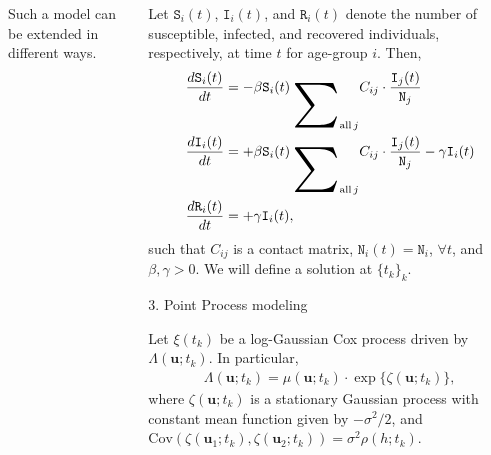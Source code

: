 \documentclass[12pt]{beamer}
\begin{document}
\begin{frame}[t]
\begin{columns}[t]
\begin{column}{0.24175\textwidth}
\begin{block}{}
			Such a model can be extended in different ways.
			
			\vspace{2pt}
			\end{block}
		
			
			\end{column}
		
			\begin{column}{0.24175\textwidth} \justifying %
			
			\begin{block}{}
			\justifying
			
			Let $\texttt{S}_i(t)$, $\texttt{I}_i(t)$, and $\texttt{R}_i(t)$ denote the number of susceptible, infected, \hspace{-1pt}and recovered individuals, \hspace{-1pt}respectively,\hspace{-1pt} at time \hspace{-1pt}$t$ for age-group $i$. Then,
			\begin{align} \label{eq:SIRmodel}
				\frac{d\texttt{S}_i(t)}{dt} &= -\beta \texttt{S}_i(t) \, \displaystyle\raisebox{-18pt}{\scalebox{3.2}{\ensuremath{\sum}}}_{\text{all}\,j}C_{ij}\cdot\frac{\texttt{I}_j(t)}{\texttt{N}_j} \\
				\frac{d\texttt{I}_i(t)}{dt} &= +\beta \texttt{S}_i(t) \, \displaystyle\raisebox{-18pt}{\scalebox{3.2}{\ensuremath{\sum}}}_{\text{all}\,j}C_{ij}\cdot\frac{\texttt{I}_j(t)}{\texttt{N}_j} - \gamma \texttt{I}_i(t) \nonumber \\
				\frac{d\texttt{R}_i(t)}{dt} &= +\gamma \texttt{I}_i(t), \nonumber
			\end{align}
			such that $C_{ij}$ is a contact matrix, $\texttt{N}_i(t) = \texttt{N}_i$, $\forall t$, and $\beta, \gamma > 0$.  We will define a solution at $\{t_k\}_k$.
			
			\vspace{18pt}
			
			\textcolor{strong-blue}{\Large 3. Point Process modeling} \justifying \vspace{12pt}
			
			Let $\xi(t_k)$ be a log-Gaussian Cox process driven by $\Lambda(\mathbf{u}; t_k)$. In particular,
			\begin{align} \label{eq:llambda}
				\Lambda(\mathbf{u}; t_k) = \mu(\mathbf{u}; t_k) \cdot \exp\{\zeta(\mathbf{u}; t_k)\},
			\end{align}
			where  $\zeta(\mathbf{u}; t_k)$ is a stationary Gaussian process with constant mean function given by $-\sigma^2/2$, and $\text{Cov}(\zeta(\mathbf{u}_1; t_k), \zeta(\mathbf{u}_2; t_k)) = \sigma^2 \rho(h; t_k)$. \vspace{12pt}
			

\end{block}
\end{column}
\end{columns}
\end{frame}
\end{document}
